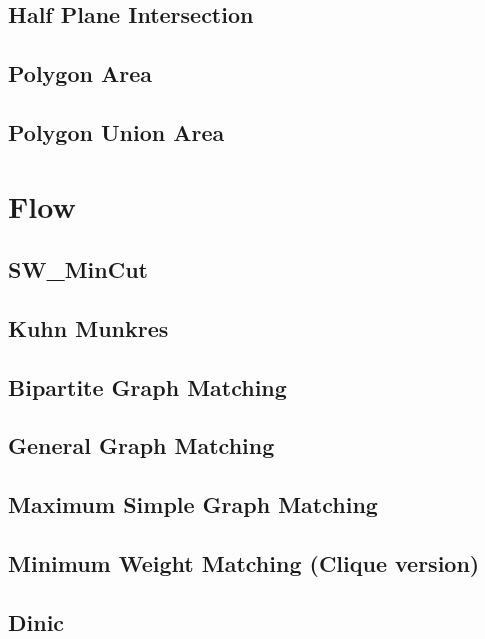 \subsection{Half Plane Intersection}

\subsection{Polygon Area}

\subsection{Polygon Union Area}


\section{Flow}
\subsection{SW\_MinCut}

\subsection{Kuhn Munkres}

\subsection{Bipartite Graph Matching}

\subsection{General Graph Matching}

\subsection{Maximum Simple Graph Matching}

\subsection{Minimum Weight Matching (Clique version)}

\subsection{Dinic}


